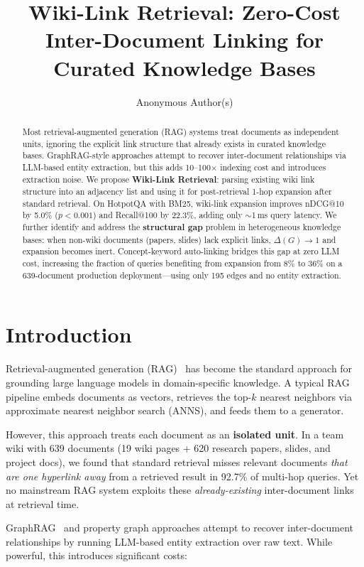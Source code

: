 \documentclass[sigconf,review]{acmart}
\title{Wiki-Link Retrieval: Zero-Cost Inter-Document Linking for Curated Knowledge Bases}
\author{Anonymous Author(s)}
\affiliation{%
  \institution{Anonymous Institution}
  \city{}
  \country{}
}
\newcommand{\sys}{Wiki-Link Retrieval\xspace}
\begin{document}
\begin{abstract}
Most retrieval-augmented generation (RAG) systems treat documents as independent
units, ignoring the explicit link structure that already exists in curated
knowledge bases. GraphRAG-style approaches attempt to recover inter-document
relationships via LLM-based entity extraction, but this adds 10--100$\times$ indexing
cost and introduces extraction noise. We propose \textbf{\sys}: parsing existing
wiki link structure into an adjacency list and using it for post-retrieval
1-hop expansion after standard retrieval.  On HotpotQA with BM25, wiki-link
expansion improves nDCG@10 by 5.0\% ($p < 0.001$) and Recall@100 by 22.3\%,
adding only ${\sim}$1\,ms query latency.  We further identify and address the
\textbf{structural gap} problem in heterogeneous knowledge bases: when non-wiki
documents (papers, slides) lack explicit links, $\Delta(G) \to 1$ and expansion
becomes inert.  Concept-keyword auto-linking bridges this gap at zero LLM
cost, increasing the fraction of queries benefiting from expansion from 8\%
to 36\% on a 639-document production deployment---using only 195 edges
and no entity extraction.
\end{abstract}

\maketitle

\section{Introduction}
\label{sec:introduction}

Retrieval-augmented generation (RAG)~\citep{lewis2020rag,gao2024rag} has become the standard approach for
grounding large language models in domain-specific knowledge. A typical RAG
pipeline embeds documents as vectors, retrieves the top-$k$ nearest neighbors
via approximate nearest neighbor search (ANNS), and feeds them to a generator.

However, this approach treats each document as an \textbf{isolated unit}.
In a team wiki with 639 documents (19 wiki pages + 620 research papers,
slides, and project docs), we found that standard retrieval misses relevant
documents \emph{that are one hyperlink away} from a retrieved result
in 92.7\% of multi-hop queries.  Yet no mainstream RAG system exploits
these \emph{already-existing} inter-document links at retrieval time.

GraphRAG~\citep{graphrag2024} and property graph approaches attempt to recover inter-document
relationships by running LLM-based entity extraction over raw text. While
powerful, this introduces significant costs:
\end{document}
